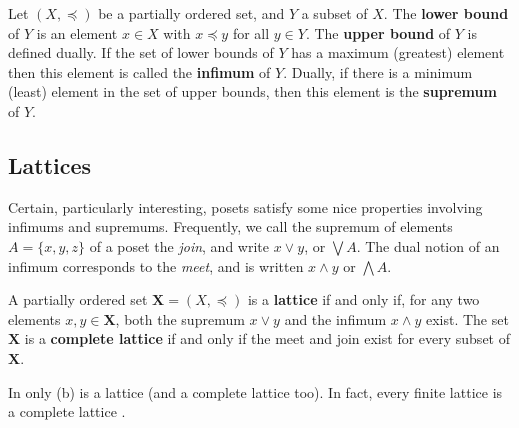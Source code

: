 \begin{definition}
  \label{definition:infimum-supremum}
  Let $(X,\preceq)$ be a partially ordered set, and $Y$ a subset of $X$. The \textbf{lower bound} of $Y$ is an element $x \in X$ with $x \preceq y$ for all $y \in Y$. The \textbf{upper bound} of $Y$ is defined dually. If the set of lower bounds of $Y$ has a maximum (greatest) element then this element is called the \textbf{infimum} of $Y$. Dually, if there is a minimum (least) element in the set of upper bounds, then this element is the \textbf{supremum} of $Y$.
   
\end{definition}

\subsection{Lattices}
\label{subsection:lattices}

Certain, particularly interesting, posets satisfy some nice properties involving infimums and supremums. Frequently, we call the supremum of elements $A = \{x,y,z\}$ of a poset the \textit{join}, and write $x \vee y$, or $\bigvee A$. The dual notion of an infimum corresponds to the \textit{meet}, and is written $x \wedge y$ or $\bigwedge A$.

\begin{definition}
  \label{definition:complete-lattice}
  A partially ordered set $\mathbf{X} = (X, \preceq)$ is a \textbf{lattice} if and only if, for any two elements $x, y \in \mathbf{X}$, both the supremum $x \vee y$ and the infimum $x \wedge y$ exist. The set $\mathbf{X}$ is a \textbf{complete lattice} if and only if the meet and join exist for every subset of $\mathbf{X}$.
\end{definition}

In  only (b) is a lattice (and a complete lattice too). In fact, every finite lattice is a complete lattice \cite{ganter1999formal}.